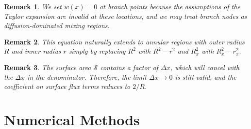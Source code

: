 \documentclass[11pt]{article}
\newtheorem{remark}{Remark}
\begin{document}
\begin{remark} 
    We set $w(x) = 0$ at branch points because the assumptions of the Taylor expansion are invalid at these locations, and we may treat branch nodes as diffusion-dominated mixing regions.
\end{remark}

\begin{remark} 
    This equation naturally extends to annular regions with outer radius $R$ and inner radius $r$ simply by replacing $R^2$ with $R^2 - r^2$ and $R_x^2$ with $R_x^2 - r_x^2$.
\end{remark}

\begin{remark}
    The surface area $\mathcal{S}$ contains a factor of $\Delta x$, which will cancel with the $\Delta x$ in the denominator. Therefore, the limit $\Delta x \to 0$ is still valid, and the coefficient on surface flux terms reduces to $2/R$. 
\end{remark}



\section{Numerical Methods}\label{sec:discretization}
\end{document}
